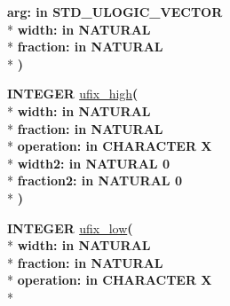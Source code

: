 \begin{DoxyCompactItemize}
{\bfseries \textcolor{vhdlchar}{arg\+: }\textcolor{stringliteral}{in }{\bfseries \textcolor{comment}{S\+T\+D\+\_\+\+U\+L\+O\+G\+I\+C\+\_\+\+V\+E\+C\+T\+O\+R}\textcolor{vhdlchar}{ }}}\\*
{\bfseries \textcolor{vhdlchar}{width\+: }\textcolor{stringliteral}{in }{\bfseries \textcolor{comment}{N\+A\+T\+U\+R\+A\+L}\textcolor{vhdlchar}{ }}}\\*
{\bfseries \textcolor{vhdlchar}{fraction\+: }\textcolor{stringliteral}{in }{\bfseries \textcolor{comment}{N\+A\+T\+U\+R\+A\+L}\textcolor{vhdlchar}{ }}}\\*
{\bfseries  )} 
\item 
{\bfseries {\bfseries \textcolor{comment}{I\+N\+T\+E\+G\+E\+R}\textcolor{vhdlchar}{ }}} \hyperlink{class__fixed__pkg_a37cd091b4844db0ca7e4cac096c73a95}{ufix\+\_\+high}{\bfseries  ( }\\*
{\bfseries \textcolor{vhdlchar}{width\+: }\textcolor{stringliteral}{in }{\bfseries \textcolor{comment}{N\+A\+T\+U\+R\+A\+L}\textcolor{vhdlchar}{ }}}\\*
{\bfseries \textcolor{vhdlchar}{fraction\+: }\textcolor{stringliteral}{in }{\bfseries \textcolor{comment}{N\+A\+T\+U\+R\+A\+L}\textcolor{vhdlchar}{ }}}\\*
{\bfseries \textcolor{vhdlchar}{operation\+: }\textcolor{stringliteral}{in }\textcolor{vhdlchar}{C\+H\+A\+R\+A\+C\+T\+E\+R   \textquotesingle{}\+X\textquotesingle{}}}\\*
{\bfseries \textcolor{vhdlchar}{width2\+: }\textcolor{stringliteral}{in }\textcolor{vhdlchar}{N\+A\+T\+U\+R\+A\+L   0}}\\*
{\bfseries \textcolor{vhdlchar}{fraction2\+: }\textcolor{stringliteral}{in }\textcolor{vhdlchar}{N\+A\+T\+U\+R\+A\+L   0}}\\*
{\bfseries  )} 
\item 
{\bfseries {\bfseries \textcolor{comment}{I\+N\+T\+E\+G\+E\+R}\textcolor{vhdlchar}{ }}} \hyperlink{class__fixed__pkg_a1b9b0c575eba1ef00399c7eada92b303}{ufix\+\_\+low}{\bfseries  ( }\\*
{\bfseries \textcolor{vhdlchar}{width\+: }\textcolor{stringliteral}{in }{\bfseries \textcolor{comment}{N\+A\+T\+U\+R\+A\+L}\textcolor{vhdlchar}{ }}}\\*
{\bfseries \textcolor{vhdlchar}{fraction\+: }\textcolor{stringliteral}{in }{\bfseries \textcolor{comment}{N\+A\+T\+U\+R\+A\+L}\textcolor{vhdlchar}{ }}}\\*
{\bfseries \textcolor{vhdlchar}{operation\+: }\textcolor{stringliteral}{in }\textcolor{vhdlchar}{C\+H\+A\+R\+A\+C\+T\+E\+R   \textquotesingle{}\+X\textquotesingle{}}}\\*

\end{DoxyCompactItemize}
